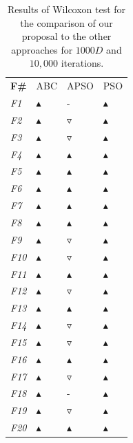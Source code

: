 \begin{table}[!h]
\caption{\small{Results of Wilcoxon test for the comparison of our proposal to the other approaches for $1000D$ and $10,000$ iterations.}}
\label{tab:Wilcoxon_1000D}
\begin{center}
\begin{tabular}{p{0.5cm}|p{1.5cm}|p{1.5cm}|p{1.5cm}}
\hline\noalign{\smallskip}
\textbf{F\#} & ABC & APSO & PSO    \\		
\noalign{\smallskip}
\hline
\noalign{\smallskip}
\textit{F1}	& $\blacktriangle$  & -  & $\blacktriangle$ \\
\textit{F2}	& $\blacktriangle$  & $\triangledown$  & $\blacktriangle$ \\
\textit{F3}	& $\blacktriangle$  & $\triangledown$  & $\blacktriangle$ \\
\textit{F4} & $\blacktriangle$  & $\blacktriangle$  & $\blacktriangle$ \\
\textit{F5} & $\blacktriangle$  & $\blacktriangle$  & $\blacktriangle$ \\
\textit{F6} & $\blacktriangle$  & $\blacktriangle$  & $\blacktriangle$ \\
\textit{F7} & $\blacktriangle$  & $\blacktriangle$  & $\blacktriangle$\\
\textit{F8} & $\blacktriangle$  & $\blacktriangle$  & $\blacktriangle$\\
\textit{F9} & $\blacktriangle$  & $\triangledown$  & $\blacktriangle$ \\
\textit{F10}& $\blacktriangle$  & $\triangledown$  & $\blacktriangle$\\
\textit{F11}& $\blacktriangle$  & $\blacktriangle$  & $\blacktriangle$\\
\textit{F12}& $\blacktriangle$  & $\triangledown$  & $\blacktriangle$\\
\textit{F13}& $\blacktriangle$  & $\blacktriangle$  & $\blacktriangle$\\
\textit{F14}& $\blacktriangle$  & $\triangledown$  & $\blacktriangle$ \\
\textit{F15}& $\blacktriangle$  & $\triangledown$  & $\blacktriangle$\\
\textit{F16}& $\blacktriangle$  & $\blacktriangle$  & $\blacktriangle$\\
\textit{F17}& $\blacktriangle$  & $\triangledown$  & $\blacktriangle$\\
\textit{F18}& $\blacktriangle$  & -  & $\blacktriangle$ \\
\textit{F19}& $\blacktriangle$  & $\triangledown$  & $\blacktriangle$  \\
\textit{F20}& $\blacktriangle$  & $\blacktriangle$  & $\blacktriangle$  \\
\hline
\end{tabular}
\end{center}
\end{table}

